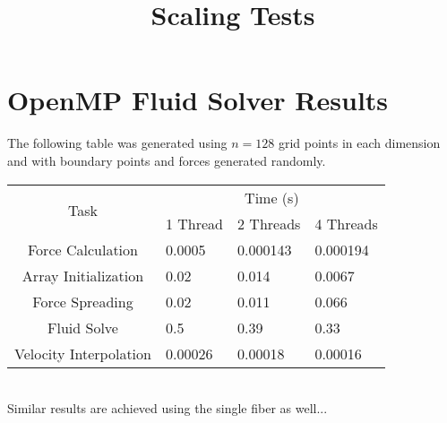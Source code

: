 \documentclass[]{article}
\title{Scaling Tests}
\begin{document}
\maketitle

\section{OpenMP Fluid Solver Results}

The following table was generated using $n=128$ grid points in each dimension and with boundary points and forces generated randomly.\\

\begin{tabular}{|c||l|l|l|}
	\hline
	\multirow{2}{*}{Task} 
	& \multicolumn{3}{c||}{Time (s)}  \\
	& 1 Thread & 2 Threads & 4 Threads  \\  \hline
	Force Calculation & 0.0005 & 0.000143 & 0.000194  \\      \hline
	Array Initialization & 0.02 & 0.014 & 0.0067  \\      \hline
	Force Spreading & 0.02 & 0.011 & 0.066 \\ \hline
	Fluid Solve & 0.5 & 0.39 & 0.33 \\ \hline
	Velocity Interpolation & 0.00026& 0.00018& 0.00016\\ \hline 
\end{tabular}
\\

Similar results are achieved using the single fiber as well...
\end{document}
